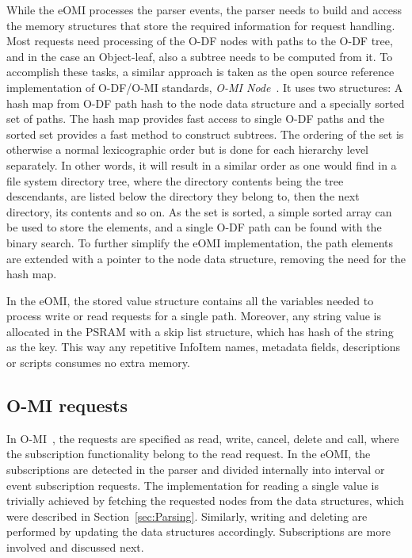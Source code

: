 While the eOMI processes the parser events, the parser needs to build and access the memory structures that store the required information for request handling. Most requests need processing of the O-DF nodes with paths to the O-DF tree, and in the case an Object-leaf, also a subtree needs to be computed from it. To accomplish these tasks, a similar approach is taken as the open source reference implementation of O-DF/O-MI standards, \emph{O-MI Node}~\cite{o-mi-node}. It uses two structures: A hash map from O-DF path hash to the node data structure and a specially sorted set of paths. The hash map provides fast access to single O-DF paths and the sorted set provides a fast method to construct subtrees. The ordering of the set is otherwise a normal lexicographic order but is done for each hierarchy level separately. In other words, it will result in a similar order as one would find in a file system directory tree, where the directory contents being the tree descendants, are listed below the directory they belong to, then the next directory, its contents and so on. As the set is sorted, a simple sorted array can be used to store the elements, and a single O-DF path can be found with the binary search. To further simplify the eOMI implementation, the path elements are extended with a pointer to the node data structure, removing the need for the hash map.

In the eOMI, the stored value structure contains all the variables needed to process write or read requests for a single path. Moreover, any string value is allocated in the PSRAM with a skip list structure, which has hash of the string as the key. This way any repetitive InfoItem names, metadata fields, descriptions or scripts consumes no extra memory.

\subsection{O-MI requests}

In O-MI~\cite{o-mi}, the requests are specified as read, write, cancel, delete and call, where the subscription functionality belong to the read request. In the eOMI, the subscriptions are detected in the parser and divided internally into interval or event subscription requests. The implementation for reading a single value is trivially achieved by fetching the requested nodes from the data structures, which were described in Section~\ref{sec:Parsing}. Similarly, writing and deleting are performed by updating the data structures accordingly. Subscriptions are more involved and discussed next.

